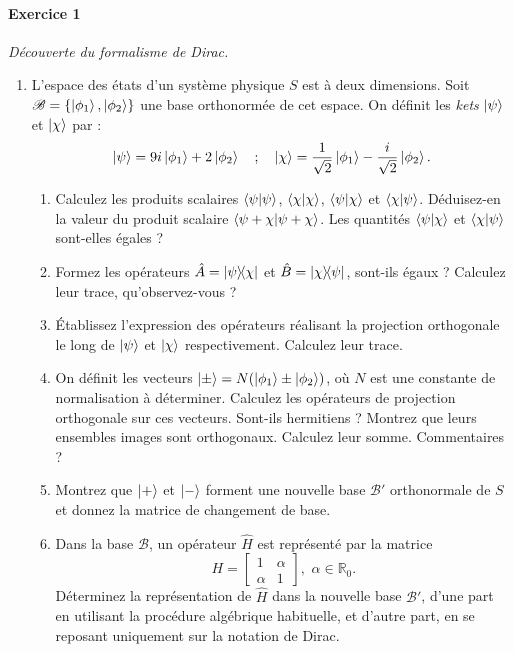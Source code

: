 \paragraph{Exercice 1} \textit{Découverte du formalisme de Dirac.}
\begin{enumerate}
\item L'espace des états d'un système physique $S$ est à deux dimensions. Soit $\mathscr B = \lbrace \ket{\phi_1},\ket{\phi_2}\rbrace$ une base orthonormée de cet espace. On définit les \textit{kets} $\ket{\psi}$ et $\ket{\chi}$ par :
	\begin{equation}
	\ket{\psi} = 9i\ket{\phi_1} + 2 \ket{\phi_2} \quad ; \quad \ket{\chi} = \frac{1}{\sqrt{2}} \ket{\phi_1} -\frac{i}{\sqrt{2}} \ket{\phi_2}.
	\end{equation}
	
\begin{enumerate}
\item Calculez les produits scalaires $\braket{\psi}{\psi}$, $\braket{\chi}{\chi}$, $\braket{\psi}{\chi}$ et $\braket{\chi}{\psi}$. Déduisez-en la valeur du produit scalaire $\braket{\psi+\chi}{\psi+\chi}$. Les quantités $\braket{\psi}{\chi}$ et $\braket{\chi}{\psi}$ sont-elles égales ?
\item Formez les opérateurs $\hat A = \ketbra{\psi}{\chi}$ et $\hat B = \ketbra{\chi}{\psi}$, sont-ils égaux ? Calculez leur trace, qu'observez-vous ?
\item Établissez l'expression des opérateurs réalisant la projection orthogonale le long de $\ket{\psi}$ et $\ket{\chi}$ respectivement. Calculez leur trace. 
\item On définit les vecteurs $\ket{\pm} = N(\ket{\phi_1}\pm\ket{\phi_2})$, où $N$ est une constante de normalisation à déterminer. Calculez les opérateurs de projection orthogonale sur ces vecteurs. Sont-ils hermitiens ? Montrez que leurs ensembles images sont orthogonaux. Calculez leur somme. Commentaires ?
\item Montrez que $\ket{+}$ et $\ket{-}$ forment une nouvelle base $\mathscr B'$ orthonormale de $S$ et donnez la matrice de changement de base.
\item Dans la base $\mathscr B$, un opérateur $\hat H$ est représenté par la matrice
\begin{equation}
H = \left[
\begin{array}{cc}
1 & \alpha \\
\alpha & 1
\end{array}
\right], \,\,\alpha\in\mathbb R_0.
\end{equation}
Déterminez la représentation de $\hat H$ dans la nouvelle base $\mathscr B'$, d'une part en utilisant la procédure algébrique habituelle, et d'autre part, en se reposant uniquement sur la notation de Dirac. 
\end{enumerate}


\end{enumerate}
